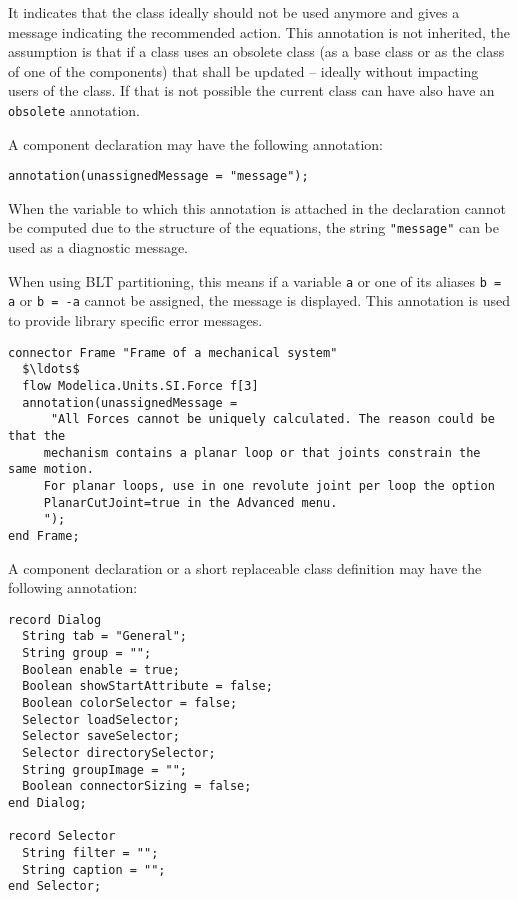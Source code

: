 It indicates that the class ideally should not be used anymore and gives a message indicating the recommended action.
This annotation is not inherited, the assumption is that if a class uses an obsolete class (as a base class or as the class of one of the components) that shall be updated -- ideally without impacting users of the class.
If that is not possible the current class can have also have an \lstinline!obsolete! annotation.

A component declaration may have the following annotation:
\begin{lstlisting}[language=modelica]
annotation(unassignedMessage = "message");
\end{lstlisting}%

When the variable to which this annotation is attached in the declaration cannot be computed due to the structure of the equations, the string \lstinline!"message"! can be used as a diagnostic message.

\begin{nonnormative}
When using BLT partitioning, this means if a variable \lstinline!a! or one of its aliases \lstinline!b = a! or \lstinline!b = -a!
cannot be assigned, the message is displayed.  This annotation is used to provide library specific error messages.
\end{nonnormative}

\begin{example}
\begin{lstlisting}[language=modelica]
connector Frame "Frame of a mechanical system"
  $\ldots$
  flow Modelica.Units.SI.Force f[3]
  annotation(unassignedMessage =
      "All Forces cannot be uniquely calculated. The reason could be that the
     mechanism contains a planar loop or that joints constrain the same motion.
     For planar loops, use in one revolute joint per loop the option
     PlanarCutJoint=true in the Advanced menu.
     ");
end Frame;
\end{lstlisting}
\end{example}

A component declaration or a short replaceable class definition may have the following annotation:
\begin{lstlisting}[language=modelica]
record Dialog
  String tab = "General";
  String group = "";
  Boolean enable = true;
  Boolean showStartAttribute = false;
  Boolean colorSelector = false;
  Selector loadSelector;
  Selector saveSelector;
  Selector directorySelector;
  String groupImage = "";
  Boolean connectorSizing = false;
end Dialog;

record Selector
  String filter = "";
  String caption = "";
end Selector;
\end{lstlisting}%

